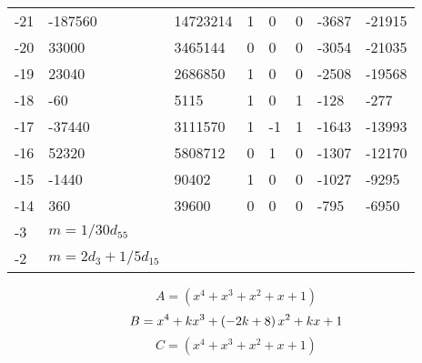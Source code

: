 \documentclass{amsart}
\begin{document}
\begin{longtable}{|l|l|l|lllll|}
-21&-187560&14723214&1&0&0&-3687&-21915\\
-20&33000&3465144&0&0&0&-3054&-21035\\
-19&23040&2686850&1&0&0&-2508&-19568\\
-18&-60&5115&1&0&1&-128&-277\\
-17&-37440&3111570&1&-1&1&-1643&-13993\\
-16&52320&5808712&0&1&0&-1307&-12170\\
-15&-1440&90402&1&0&0&-1027&-9295\\
-14&360&39600&0&0&0&-795&-6950\\
-3&$m=1/30d_{55}$&&\multicolumn{5}{c|}{}\\
-2&$m=2d_{3}+1/5d_{15}$&&\multicolumn{5}{c|}{}\\
\hline
\end{longtable}
$$A=(x^4
 + x^3
 + x^2
 + x
 + 1)$$
$$B=x^4
 + k\*x^3
 + \left(-2\*k
 + 8\right) \*x^2
 + k\*x
 + 1$$
$$C=(x^4
 + x^3
 + x^2
 + x
 + 1)$$
\end{document}
